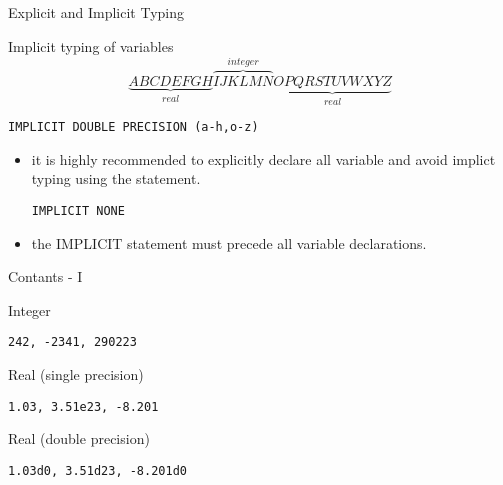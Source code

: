 
\begin{frame}[fragile]{Explicit and Implicit Typing}
\begin{block}{Implicit typing of variables}
$$\underbrace{ABCDEFGH}_{real}\overbrace{IJKLMN}^{integer}\underbrace{OPQRSTUVWXYZ}_{real}$$
\end{block}
\begin{lstlisting}
IMPLICIT DOUBLE PRECISION (a-h,o-z)
\end{lstlisting}
\begin{itemize}
 \item it is highly recommended to explicitly declare all variable and
avoid implict typing using the statement.
\begin{lstlisting}
IMPLICIT NONE
\end{lstlisting}
 \item the IMPLICIT statement must precede all variable declarations.
\end{itemize}
\end{frame}

\begin{frame}[fragile]{Contants - I}
\begin{block}{Integer}
\begin{lstlisting}
242, -2341, 290223
\end{lstlisting}
\end{block}
\begin{block}{Real (single precision)}
\begin{lstlisting}
1.03, 3.51e23, -8.201
\end{lstlisting}
\end{block}
\begin{block}{Real (double precision)}
\begin{lstlisting}
1.03d0, 3.51d23, -8.201d0
\end{lstlisting}
\end{block}
\end{frame}

